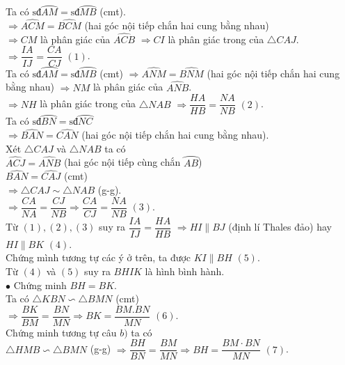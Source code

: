 \begin{bt}
{\begin{enumerate}
	Ta có $\text{sđ}\wideparen{AM}=\text{sđ}\wideparen{MB}$ (cmt).\\
	$\Rightarrow \widehat{ACM}=\widehat{BCM}$ (hai góc nội tiếp chắn hai cung bằng nhau)\\
	$\Rightarrow CM$ là phân giác của $\widehat{ACB}$ $\Rightarrow CI$ là phân giác trong của $\triangle CAJ$.\\
	$\Rightarrow \dfrac{IA}{IJ}=\dfrac{CA}{CJ}$	\qquad $(1)$.\\
	Ta có $ \text{sđ}\wideparen{AM}=\text{sđ}\wideparen{MB}$ (cmt)
	$\Rightarrow \widehat{ANM}=\widehat{BNM}$ (hai góc nội tiếp chắn hai cung bằng nhau)
	$\Rightarrow NM$ là phân giác của $\widehat{ANB}$.\\
	$\Rightarrow NH$ là phân giác trong của $\triangle NAB$
	$\Rightarrow \dfrac{HA}{HB}=\dfrac{NA}{NB}$	\qquad $(2)$.\\
	Ta có $\text{sđ}\wideparen{BN}=\text{sđ}\wideparen{NC}$\\
	$\Rightarrow \widehat{BAN}=\widehat{CAN}$ (hai góc nội tiếp chắn hai cung bằng nhau).\\
	Xét $\triangle CAJ$ và $\triangle NAB$ ta có\\
	$\widehat{ACJ}=\widehat{ANB}$ (hai góc nội tiếp cùng chắn $\wideparen{AB}$)\\
	$\widehat{BAN}=\widehat{CAJ}$ (cmt)\\
	$\Rightarrow \triangle CAJ\sim \triangle NAB $ (g-g).\\
	$\Rightarrow \dfrac{CA}{NA}=\dfrac{CJ}{NB}\Rightarrow \dfrac{CA}{CJ}=\dfrac{NA}{NB}$ \qquad	$(3)$.\\
	Từ $(1),(2),(3)$  suy ra $\dfrac{IA}{IJ}=\dfrac{HA}{HB}$
	$\Rightarrow HI\parallel BJ$ (định lí Thales đảo) hay $HI\parallel BK$ \qquad	$(4)$.\\
	Chứng mình tương tự các ý ở trên, ta được $KI\parallel BH$	\qquad	$(5)$.\\
	Từ $(4) $ và $(5) $ suy ra $BHIK$ là hình bình hành.\\
	$\bullet$ Chứng minh $BH=BK$.\\
	Ta có  $\triangle KBN\backsim \triangle BMN$ (cmt)\\
	 $\Rightarrow \dfrac{BK}{BM}=\dfrac{BN}{MN}\Rightarrow BK=\dfrac{BM.BN}{MN}$ \qquad	$(6)$.\\
	Chứng minh tương tự câu $b)$  ta có\\
	 $\triangle HMB\backsim \triangle BMN$ (g-g)
	$\Rightarrow \dfrac{BH}{BN}=\dfrac{BM}{MN}\Rightarrow BH=\dfrac{BM\cdot BN}{MN}$ \qquad	$(7)$.\\

\end{enumerate}}
\end{bt}
